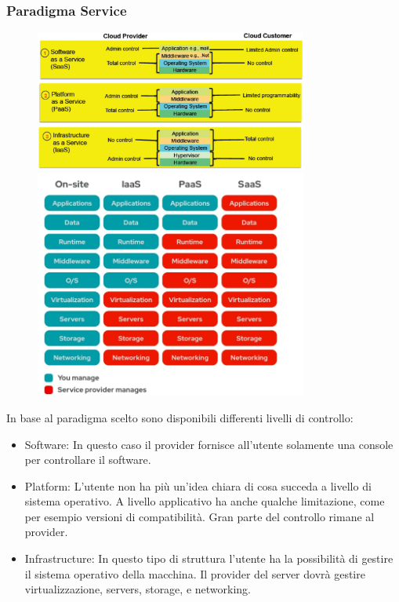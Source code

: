 \documentclass{article}
\begin{document}
		\subsubsection{Paradigma Service}
		\begin{figure}[ht]
			\begin{minipage}{0.45\textwidth}
			\centering
			\includegraphics[width=0.8\textwidth]{SAC_05.png}
			\end{minipage}
			\begin{minipage}{0.45\textwidth}
				\centering
				\includegraphics[width=0.8\textwidth]{SAC_A2_service_paradigm.jpg}
			\end{minipage}
		\end{figure}
		In base al paradigma scelto sono disponibili differenti livelli di controllo:
		\begin{itemize}
		    \item Software: In questo caso il provider fornisce all'utente solamente una console per controllare il software.
		    \item Platform: L'utente non ha più un'idea chiara di cosa succeda a livello di sistema operativo. A livello applicativo ha anche qualche limitazione, come per esempio versioni di compatibilità. Gran parte del controllo rimane al provider.
		    \item Infrastructure: In questo tipo di struttura l'utente ha la possibilità di gestire il sistema operativo della macchina. Il provider del server dovrà gestire virtualizzazione, servers, storage, e networking.
		\end{itemize}
		
\end{document}
